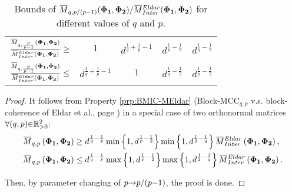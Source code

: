 \begin{property}
\begin{table}[bp]
\begin{tabular}{ccccc}
\multicolumn{1}{r}{${\frac{\overbar{M}_{q,\frac{p}{p-1}}\myparanthese{\myPhiOne , \myPhiTwo}}{\overbar{M}^{Eldar}_{Inter}\myparanthese{\myPhiOne , \myPhiTwo}} \geq}$} &\multicolumn{1}{c}{$1$} & \multicolumn{1}{c}{$d^{\frac1q + \frac1p -1}$} & \multicolumn{1}{c}{$d^{\frac1p - \frac12}$} &\multicolumn{1}{c}{$d^{\frac1q - \frac12}$}    \\
\multicolumn{1}{r}{${\frac{\overbar{M}_{q,\frac{p}{p-1}}\myparanthese{\myPhiOne , \myPhiTwo}}{\overbar{M}^{Eldar}_{Inter}\myparanthese{\myPhiOne , \myPhiTwo}} \leq}$} &\multicolumn{1}{c}{$d^{\frac1q + \frac1p -1}$} & \multicolumn{1}{c}{$1$} & \multicolumn{1}{c}{$d^{\frac1q - \frac12}$} &\multicolumn{1}{c}{$d^{\frac1p - \frac12}$}    \\ 
\bottomrule %
\end{tabular}
\caption{Bounds of $\overbar{M}_{q,p/(p \sm 1)} (\myPhiOne , \myPhiTwo) / \overbar{M}^{Eldar}_{Inter}(\myPhiOne,\myPhiTwo)$ for different values of $q$ and $p$.}
\label{table:BasicBMCC-BasicEldar}
\end{table}
\end{property}
\begin{proof}
It follows from Property \ref{prp:BMIC-MEldar} (Block-MCC$_{q,p}$ v.s. block-coherence of Eldar et al., page \pageref{prp:BMIC-MEldar}) in a special case of two orthonormal matrices $\forall (q , p) {\in} \mathbb{R}^2_{{>} 0}$:
\begin{gather*}
\begin{aligned}
&\overbar{M}_{q,p}\myparanthese{\myPhiOne , \myPhiTwo} \geq d^{\frac1q - \frac1p} \min \mybrace{1 , d^{\frac1p - \frac{1}{2}}} \min \mybrace{1 , d^{\frac{1}{2} - \frac1q}} \overbar{M}^{Eldar}_{Inter}\myparanthese{\myPhiOne , \myPhiTwo}, \\
&\overbar{M}_{q,p}\myparanthese{\myPhiOne , \myPhiTwo} \leq d^{\frac1q - \frac1p} \max \mybrace{1 , d^{\frac1p - \frac{1}{2}}} \max \mybrace{1 , d^{\frac{1}{2} - \frac1q}} \overbar{M}^{Eldar}_{Inter}\myparanthese{\myPhiOne , \myPhiTwo}.
\end{aligned}
\end{gather*}

Then, by parameter changing of $p {\to} p/(p {-} 1)$, the proof is done.
\end{proof}